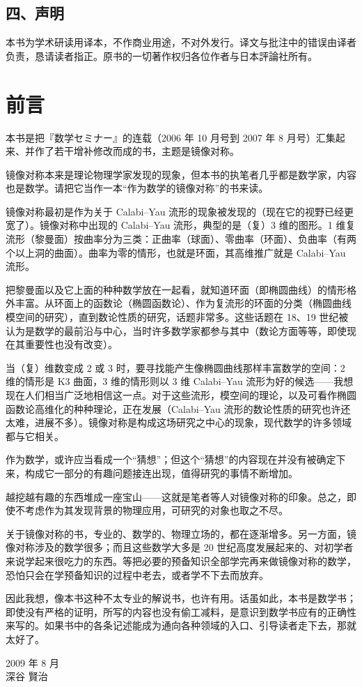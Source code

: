 \section*{四、声明}

本书为学术研读用译本，不作商业用途，不对外发行。译文与批注中的错误由译者负责，恳请读者指正。原书的一切著作权归各位作者与日本評論社所有。

\clearpage

\chapter*{前言}

本书是把『数学セミナー』的连载（2006 年 10 月号到 2007 年 8 月号）汇集起来、并作了若干增补修改而成的书，主题是镜像对称。

镜像对称本来是理论物理学家发现的现象，但本书的执笔者几乎都是数学家，内容也是数学。请把它当作一本“作为数学的镜像对称”的书来读。

镜像对称最初是作为关于 Calabi--Yau 流形的现象被发现的（现在它的视野已经更宽了）。镜像对称中出现的 Calabi--Yau 流形，典型的是（复）3 维的图形。1 维复流形（黎曼面）按曲率分为三类：正曲率（球面）、零曲率（环面）、负曲率（有两个以上洞的曲面）。曲率为零的情形，也就是环面，其高维推广就是 Calabi--Yau 流形。

把黎曼面以及它上面的种种数学放在一起看，就知道环面（即椭圆曲线）的情形格外丰富。从环面上的函数论（椭圆函数论）、作为复流形的环面的分类（椭圆曲线模空间的研究），直到数论性质的研究，话题非常多。这些话题在 18、19 世纪被认为是数学的最前沿与中心，当时许多数学家都参与其中（数论方面等等，即使现在其重要性也没有改变）。

当（复）维数变成 2 或 3 时，要寻找能产生像椭圆曲线那样丰富数学的空间：2 维的情形是 K3 曲面，3 维的情形则以 3 维 Calabi--Yau 流形为好的候选——我想现在人们相当广泛地相信这一点。对于这些流形，模空间的理论，以及可看作椭圆函数论高维化的种种理论，正在发展（Calabi--Yau 流形的数论性质的研究也许还太难，进展不多）。镜像对称是构成这场研究之中心的现象，现代数学的许多领域都与它相关。

作为数学，或许应当看成一个“猜想”；但这个“猜想”的内容现在并没有被确定下来，构成它一部分的有趣问题接连出现，值得研究的事情不断增加。

越挖越有趣的东西堆成一座宝山——这就是笔者等人对镜像对称的印象。总之，即使不考虑作为其发现背景的物理应用，可研究的对象也取之不尽。

关于镜像对称的书，专业的、数学的、物理立场的，都在逐渐增多。另一方面，镜像对称涉及的数学很多；而且这些数学大多是 20 世纪高度发展起来的、对初学者来说学起来很吃力的东西。等把必要的预备知识全部学完再来做镜像对称的数学，恐怕只会在学预备知识的过程中老去，或者学不下去而放弃。

\enlargethispage{9\baselineskip}
因此我想，像本书这种不太专业的解说书，也许有用。话虽如此，本书是数学书；即使没有严格的证明，所写的内容也没有偷工减料，是意识到数学书应有的正确性来写的。如果书中的各条记述能成为通向各种领域的入口、引导读者走下去，那就太好了。

\medskip
\begin{flushright}
2009 年 8 月\\
深谷 賢治
\end{flushright}
